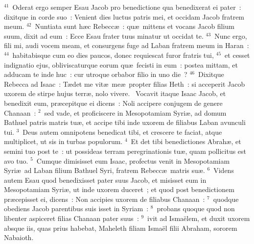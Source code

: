 ${}^{41}$~Oderat ergo semper Esau Jacob pro benedictione qua benedixerat ei pater~: dixitque in corde suo~: Venient dies luctus patris mei, et occidam Jacob fratrem meum.
${}^{42}$~Nuntiata sunt h\ae c Rebecc\ae~: qu\ae\ mittens et vocans Jacob filium suum, dixit ad eum~: Ecce Esau frater tuus minatur ut occidat te.
${}^{43}$~Nunc ergo, fili mi, audi vocem meam, et consurgens fuge ad Laban fratrem meum in Haran~:
${}^{44}$~habitabisque cum eo dies paucos, donec requiescat furor fratris tui,
${}^{45}$~et cesset indignatio ejus, obliviscaturque eorum qu\ae\ fecisti in eum~: postea mittam, et adducam te inde huc~: cur utroque orbabor filio in uno die~?
${}^{46}$~Dixitque Rebecca ad Isaac~: T\ae det me vit\ae\ me\ae\ propter filias Heth~: si acceperit Jacob uxorem de stirpe hujus terr\ae , nolo vivere.
~Vocavit itaque Isaac Jacob, et benedixit eum, pr\ae cepitque ei dicens~: Noli accipere conjugem de genere Chanaan~:
${}^{2}$~sed vade, et proficiscere in Mesopotamiam Syri\ae , ad domum Bathuel patris matris tu\ae , et accipe tibi inde uxorem de filiabus Laban avunculi tui.
${}^{3}$~Deus autem omnipotens benedicat tibi, et crescere te faciat, atque multiplicet, ut sis in turbas populorum.
${}^{4}$~Et det tibi benedictiones Abrah\ae , et semini tuo post te~: ut possideas terram peregrinationis tu\ae , quam pollicitus est avo tuo.
${}^{5}$~Cumque dimisisset eum Isaac, profectus venit in Mesopotamiam Syri\ae\ ad Laban filium Bathuel Syri, fratrem Rebecc\ae\ matris su\ae .
${}^{6}$~Videns autem Esau quod benedixisset pater suus Jacob, et misisset eum in Mesopotamiam Syri\ae , ut inde uxorem duceret~; et quod post benedictionem pr\ae cepisset ei, dicens~: Non accipies uxorem de filiabus Chanaan~:
${}^{7}$~quodque obediens Jacob parentibus suis isset in Syriam~:
${}^{8}$~probans quoque quod non libenter aspiceret filias Chanaan pater suus~:
${}^{9}$~ivit ad Isma\"elem, et duxit uxorem absque iis, quas prius habebat, Maheleth filiam Isma\"el filii Abraham, sororem Nabaioth.


